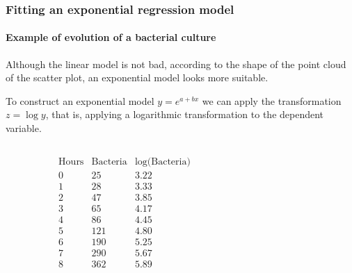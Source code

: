 \begin{frame}
\frametitle{Fitting an exponential regression model}
\framesubtitle{Example of evolution of a bacterial culture}
Although the linear model is not bad, according to the shape of the point cloud of the scatter plot, an exponential
model looks more suitable. 

To construct an exponential model $y = e^{a+bx}$ we can apply the transformation $z=\log y$, that is, applying
a logarithmic transformation to the dependent variable.
\begin{columns}
\begin{column}{0.45\textwidth}
\[
\begin{array}{c|c|c}
\mbox{Hours} & \mbox{Bacteria} & \mbox{$\log$(Bacteria)}\\
\hline
0 &  25 & 3.22\\
1 & 28 & 3.33\\
2 &  47 & 3.85\\
3 & 65  & 4.17\\
4 & 86 & 4.45\\
5 & 121 & 4.80\\
6 & 190 & 5.25\\
7 & 290 & 5.67\\
8 & 362 & 5.89
\end{array}
\]
\end{column}
\begin{column}{0.55\textwidth}
\begin{center}
\end{center}
\end{column}
\end{columns}
\end{frame}


